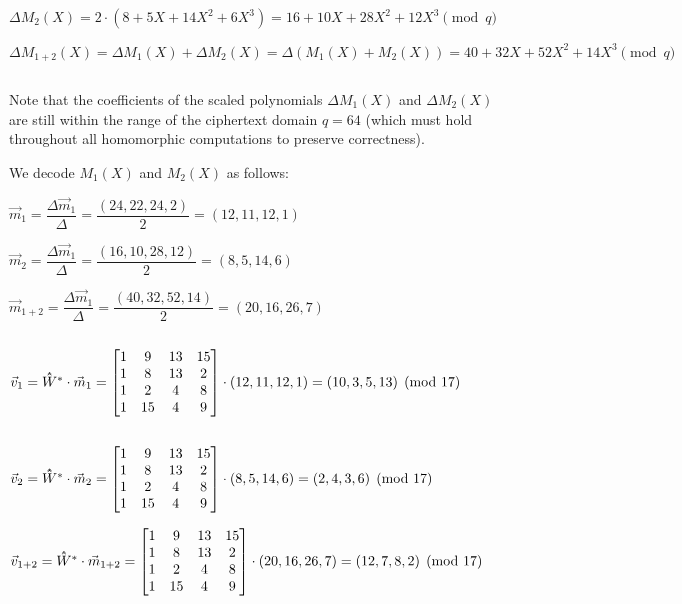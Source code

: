 $\Delta M_2(X) = 2\cdot(8 + 5X + 14X^2 + 6X^3) = 16 + 10X + 28X^2 + 12X^3 \pmod{q}$

$\Delta M_{1+2}(X) = \Delta M_1(X) + \Delta M_2(X) = \Delta (M_1(X) + M_2(X)) = 40 + 32X + 52X^2 + 14X^3 \pmod{q}$

$ $

Note that the coefficients of the scaled polynomials $\Delta M_1(X)$ and $\Delta M_2(X)$ are still within the range of the ciphertext domain $q=64$ (which must hold throughout all homomorphic computations to preserve correctness). 

We decode $M_1(X)$ and $M_2(X)$ as follows: 

$\vec{m}_1 = \dfrac{\Delta \vec{m}_1}{\Delta} = \dfrac{(24, 22, 24, 2)}{2} = (12, 11, 12, 1)$

$\vec{m}_2 = \dfrac{\Delta \vec{m}_1}{\Delta} = \dfrac{(16, 10, 28, 12)}{2} = (8, 5, 14, 6)$

$\vec{m}_{1+2} = \dfrac{\Delta \vec{m}_1}{\Delta} = \dfrac{(40, 32, 52, 14)}{2} = (20, 16, 26, 7)$

$ $


$\vec{v}_1 = \hathat W^* \cdot \vec{m}_1 = \begin{bmatrix}
1 & 9 & 13 & 15\\
1 & 8 & 13 & 2\\
1 & 2 & 4 & 8\\
1 & 15 & 4 & 9\\
\end{bmatrix} \cdot (12, 11, 12, 1) = (10, 3, 5, 13) \pmod{17}$

$ $

$\vec{v}_2 = \hathat W^* \cdot \vec{m}_2 = \begin{bmatrix}
1 & 9 & 13 & 15\\
1 & 8 & 13 & 2\\
1 & 2 & 4 & 8\\
1 & 15 & 4 & 9\\
\end{bmatrix} \cdot (8, 5, 14, 6) = (2, 4, 3, 6) \pmod{17}$

$\vec{v}_{1+2} = \hathat W^* \cdot \vec{m}_{1+2} = \begin{bmatrix}
1 & 9 & 13 & 15\\
1 & 8 & 13 & 2\\
1 & 2 & 4 & 8\\
1 & 15 & 4 & 9\\
\end{bmatrix} \cdot (20, 16, 26, 7) = (12, 7, 8, 2) \pmod{17}$


